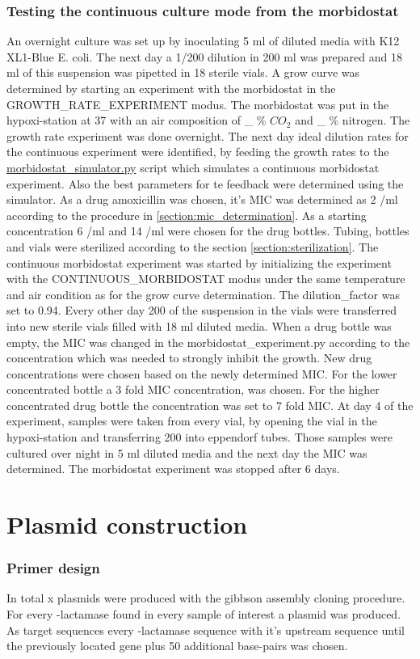\subsubsection{Testing the continuous culture mode from the morbidostat}
An overnight culture was set up by inoculating 5 ml of diluted media with K12 XL1-Blue E. coli. The next day a 1/200 dilution in 200 ml was prepared and 18 ml of this suspension was pipetted in 18 sterile vials. A grow curve was determined by starting an experiment with the morbidostat in the GROWTH\_RATE\_EXPERIMENT modus. The morbidostat was put in the hypoxi-station at 37 \degree \space with an air composition of \_ \% $CO_2$ and \_ \% nitrogen. The growth rate experiment was done overnight. The next day ideal dilution rates for the continuous experiment were identified, by feeding the growth rates to the \href{https://github.com/nahanoo/ESBL\_project/}{morbidostat\_simulator.py} script which simulates a continuous morbidostat experiment. Also the best parameters for te feedback were determined using the simulator.
As a drug amoxicillin was chosen, it's MIC was determined as 2 \textmu/ml according to the procedure in \ref{section:mic_determination}. As a starting concentration 6 \textmu/ml and 14 \textmu/ml 
were chosen for the drug bottles. Tubing, bottles and vials were sterilized according to the section \ref{section:sterilization}. The continuous morbidostat experiment was started by initializing the experiment with the 	CONTINUOUS\_MORBIDOSTAT modus under the same temperature and air condition as for the grow curve determination. The dilution\_factor was set to 0.94. Every other day 200 \textmu of the suspension in the vials were transferred into new sterile vials filled with 18 ml diluted media. When a drug bottle was empty, the MIC was changed in the morbidostat\_experiment.py according to the concentration which was needed to strongly inhibit the growth. New drug concentrations were chosen based on the newly determined MIC. For the lower concentrated bottle a 3 fold MIC concentration, was chosen. For the higher concentrated drug bottle the concentration was set to 7 fold MIC. At day 4 of the experiment, samples were taken from every vial, by opening the vial in the hypoxi-station and transferring 200 \textmu into eppendorf tubes. Those samples were cultured over night in 5 ml diluted media and the next day the MIC was determined. The morbidostat experiment was stopped after 6 days.

\section{Plasmid construction}
\subsubsection{Primer design}
In total x plasmids were produced with the gibbson assembly cloning procedure. For every \textbeta-lactamase found in every sample of interest a plasmid was produced. As target sequences every \textbeta-lactamase sequence with it's upstream sequence until the previously located gene plus 50 additional base-pairs was chosen. 





 